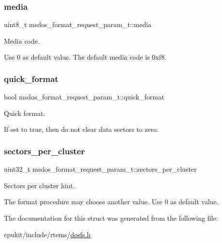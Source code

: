 \subsubsection{\texorpdfstring{media}{media}}
{\footnotesize\ttfamily uint8\+\_\+t msdos\+\_\+format\+\_\+request\+\_\+param\+\_\+t\+::media}



Media code. 

Use 0 as default value. The default media code is 0xf8. \mbox{\label{structmsdos__format__request__param__t_a8a7f584248fed36d12e58ea0ed4b4df3}} 
\subsubsection{\texorpdfstring{quick\_format}{quick\_format}}
{\footnotesize\ttfamily bool msdos\+\_\+format\+\_\+request\+\_\+param\+\_\+t\+::quick\+\_\+format}



Quick format. 

If set to true, then do not clear data sectors to zero. \mbox{\label{structmsdos__format__request__param__t_a2c1c74caf7bc79529632bc6afcdae6e1}} 
\subsubsection{\texorpdfstring{sectors\_per\_cluster}{sectors\_per\_cluster}}
{\footnotesize\ttfamily uint32\+\_\+t msdos\+\_\+format\+\_\+request\+\_\+param\+\_\+t\+::sectors\+\_\+per\+\_\+cluster}



Sectors per cluster hint. 

The format procedure may choose another value. Use 0 as default value. 

The documentation for this struct was generated from the following file\+:\begin{DoxyCompactItemize}
\item 
cpukit/include/rtems/\mbox{\hyperlink{dosfs_8h}{dosfs.\+h}}\end{DoxyCompactItemize}
